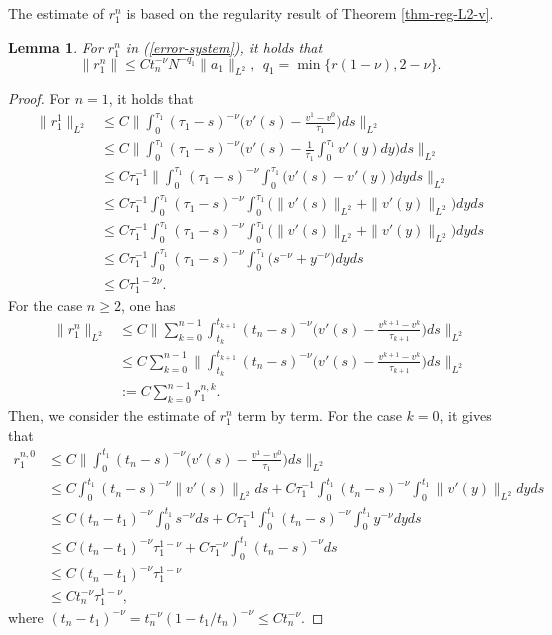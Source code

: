 \documentclass[11pt]{article}
\newtheorem{lemma}{Lemma}[section]
\numberwithin{equation}{section}
\begin{document}
The estimate of $r_1^n$ is based on the regularity result of Theorem \ref{thm-reg-L2-v}.
\begin{lemma}\label{lem-r-1}
For $r_1^n$ in (\ref{error-system}), it holds that
\[
\|r_1^n\| \le Ct_n^{-\nu}N^{-q_1}\|a_1\|_{L^2},~~q_1=\min\{r(1-\nu),2-\nu\}.
\]
\end{lemma}
\begin{proof}
For $n=1$, it holds that
\begin{align*}
\|r_1^1\|_{L^2}
&\le C\bigg\|\int_0^{\tau_1}(\tau_1-s)^{-\nu}\bigg(v'(s)-\frac{v^1-v^0}{\tau_1}\bigg)ds\bigg\|_{L^2}\\
&\le C\bigg\|\int_0^{\tau_1}(\tau_1-s)^{-\nu}\bigg(v'(s)-\frac{1}{\tau_1}\int_0^{\tau_1}v'(y)dy\bigg)ds\bigg\|_{L^2}\\
&\le C\tau_1^{-1}\bigg\|\int_0^{\tau_1}(\tau_1-s)^{-\nu}\int_0^{\tau_1}\big(v'(s)-v'(y)\big)dyds\bigg\|_{L^2}\\
&\le C\tau_1^{-1}\int_0^{\tau_1}(\tau_1-s)^{-\nu}\int_0^{\tau_1}\big(\|v'(s)\|_{L^2}+\|v'(y)\|_{L^2}\big)dyds\\
&\le C\tau_1^{-1}\int_0^{\tau_1}(\tau_1-s)^{-\nu}\int_0^{\tau_1}\big(\|v'(s)\|_{L^2}+\|v'(y)\|_{L^2}\big)dyds\\
&\le C\tau_1^{-1}\int_0^{\tau_1}(\tau_1-s)^{-\nu}\int_0^{\tau_1}\big(s^{-\nu}+y^{-\nu}\big)dyds\\
&\le C\tau_1^{1-2\nu}.
\end{align*}
For the case $n\geq2$, one has
\begin{align*}
\|r_1^n\|_{L^2}
&\le C\bigg\|\sum_{k=0}^{n-1}\int_{t_k}^{t_{k+1}}(t_n-s)^{-\nu}\bigg(v'(s)-\frac{v^{k+1}-v^k}{\tau_{k+1}}\bigg)ds\bigg\|_{L^2}\\
&\le C\sum_{k=0}^{n-1}\bigg\|\int_{t_k}^{t_{k+1}}(t_n-s)^{-\nu}\bigg(v'(s)-\frac{v^{k+1}-v^k}{\tau_{k+1}}\bigg)ds\bigg\|_{L^2}\\
&:=C\sum_{k=0}^{n-1}r_1^{n,k}.
\end{align*}
Then, we consider the estimate of $r_1^n$ term by term. For the case $k=0$, it gives that
\begin{align*}
r_1^{n,0}
&\le C\bigg\|\int_{0}^{t_1}(t_n-s)^{-\nu}\bigg(v'(s)-\frac{v^1-v^0}{\tau_1}\bigg)ds\bigg\|_{L^2}\\
&\le C\int_{0}^{t_1}(t_n-s)^{-\nu}\|v'(s)\|_{L^2}ds+C\tau_1^{-1}\int_0^{t_1}(t_n-s)^{-\nu}\int_0^{t_1}\|v'(y)\|_{L^2}dyds\\
&\le C(t_n-t_1)^{-\nu}\int_0^{t_1}s^{-\nu}ds+C\tau_1^{-1}\int_0^{t_1}(t_n-s)^{-\nu}\int_0^{t_1}y^{-\nu}dyds\\
&\le C(t_n-t_1)^{-\nu}\tau_1^{1-\nu}+C\tau_1^{-\nu}\int_0^{t_1}(t_n-s)^{-\nu}ds\\
&\le C(t_n-t_1)^{-\nu}\tau_1^{1-\nu}\\
&\le Ct_n^{-\nu}\tau_1^{1-\nu},
\end{align*}
where $(t_n-t_1)^{-\nu}=t_n^{-\nu}(1-t_1/t_n)^{-\nu}\le Ct_n^{-\nu}$.


\end{proof}
\end{document}
